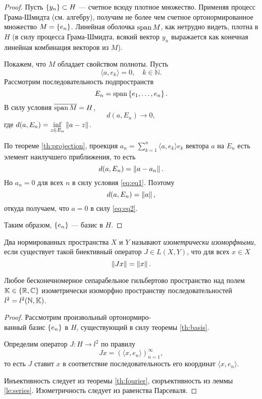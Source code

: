 \begin{proof}
    Пусть $\left\{y_n\right\} \subset H$ --- счетное всюду плотное множество. Применяя процесс Грама-Шмидта (см. алгебру), получим не более чем счетное 
    ортонормированное множество $M = \left\{e_n\right\}$. Линейная оболочка $\operatorname{span} M$,
    как нетрудно видеть, плотна в $H$ (в силу процесса Грама-Шмидта, всякий вектор $y_n$ 
    выражается как конечная линейная комбинация векторов из $M$). 

    Покажем, что $M$ обладает свойством полноты. Пусть 
    \begin{equation}\label{eq:eq1}
        \langle a, e_k \rangle = 0, \quad k \in \mathbb N.
    \end{equation}
    Рассмотрим последовательность подпространств
    \[ E_n = \operatorname{span} \left\{e_1, \dotsc, e_n\right\}. \] 
    В силу условия $\overline{\operatorname{span} M} = H$,
    \begin{equation}\label{eq:eq2}
        d(a, E_n) \to 0,
    \end{equation}    
    где $d(a, E_n) = \inf\limits_{z \in E_n} \left\|a - z\right\|$.

    По теореме \ref{th:projection}, проекция 
    $a_n = \sum\limits_{k=1}^n \langle a, e_k \rangle e_k$ 
    вектора $a$ на $E_n$ есть элемент наилучшего приближения, то есть
    \[ d(a, E_n) = \left\|a - a_n\right\|. \]
    Но $a_n = 0$ для всех $n$ в силу условия \eqref{eq:eq1}. Поэтому
    \[ d(a, E_n) = \left\|a\right\|, \]
    откуда получаем, что $a = 0$ в силу \eqref{eq:eq2}.

    Таким образом, $\left\{e_n\right\}$ --- базис в $H$.
\end{proof}

\begin{definition}
    Два нормированных пространства $X$ и $Y$ называют \emph{изометрически изоморфными}, если
    существует такой биективный оператор $J \in L(X, Y)$, что для всех $x \in X$
    \[ \left\|Jx\right\| = \left\|x\right\|. \]
\end{definition}

\begin{theorem}
    Любое бесконечномерное сепарабельное гильбертово пространство над полем $\mathbb{K} \in \left\{\mathbb{R}, \mathbb{C}\right\}$
    изометрически изоморфно пространству последовательностей $l^2 = l^2(\mathbb N, \mathbb{K})$.
\end{theorem}

\begin{proof}
    Рассмотрим произвольный ортонормиро-\\ванный базис $\left\{e_n\right\}$ в $H$, существующий в силу теоремы \ref{th:basis}. 

    Определим оператор $J \colon H \to l^2$ по правилу
    \[ Jx = (\langle x, e_n \rangle)_{n=1}^\infty, \]
    то есть $J$ ставит $x$ в соответствие последовательность его 
    координат $\langle x, e_n \rangle$.

    Инъективность следует из теоремы \ref{th:fourier}, сюръективность из леммы \ref{le:series}.
    Изометричность следует из равенства Парсеваля.
\end{proof}

